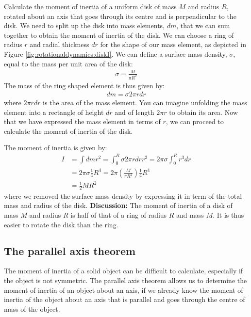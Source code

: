 \begin{example}{Calculate the moment of inertia of a uniform disk of mass $M$ and radius $R$, rotated about an axis that goes through its centre and is perpendicular to the disk.}
We need to split up the disk into mass elements, $dm$, that we can sum together to obtain the moment of inertia of the disk. We can choose a ring of radius $r$ and radial thickness $dr$ for the shape of our mass element, as depicted in Figure \ref{fig:rotationaldynamics:diskI}.
We can define a surface mass density, $\sigma$, equal to the mass per unit area of the disk:
\begin{align*}
\sigma = \frac{M}{\pi R^2}
\end{align*}
The mass of the ring shaped element is thus given by:
\begin{align*}
dm = \sigma 2\pi r dr
\end{align*}
where $2\pi r dr$ is the area of the mass element. You can imagine unfolding the mass element into a rectangle of height $dr$ and of length $2\pi r$ to obtain its area. Now that we have expressed the mass element in terms of $r$, we can proceed to calculate the moment of inertia of the disk.

The moment of inertia is given by:
\begin{align*}
I &= \int dm r^2 = \int_0^R \sigma 2\pi r dr r^2 =2\pi \sigma \int_0^R  r^3 dr \\
&=2 \pi \sigma \frac{1}{4}R^4 = 2\pi \left( \frac{M}{\pi R^2} \right) \frac{1}{4}R^4\\
&=\frac{1}{2}MR^2
\end{align*}
where we removed the surface mass density by expressing it in term of the total mass and radius of the disk. 
\textbf{Discussion:} The moment of inertia of a disk of mass $M$ and radius $R$ is half of that of a ring of radius $R$ and mass $M$. It is thus easier to rotate the disk than the ring. 
\end{example}

\subsection{The parallel axis theorem}
The moment of inertia of a solid object can be difficult to calculate, especially if the object is not symmetric. The parallel axis theorem allows us to determine the moment of inertia of an object about an axis, if we already know the moment of inertia of the object about an axis that is parallel and goes through the centre of mass of the object.

